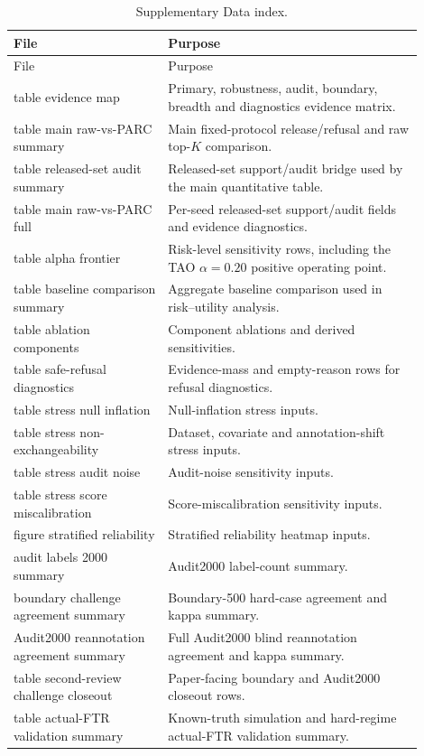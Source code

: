 \documentclass[11pt]{article}
\begin{document}
\begingroup
\small
\begin{longtable}{p{0.34\linewidth}p{0.56\linewidth}}
\caption{Supplementary Data index.}\\
\toprule
File & Purpose \\
\midrule
\endfirsthead
\toprule
File & Purpose \\
\midrule
\endhead
table evidence map & Primary, robustness, audit, boundary, breadth and diagnostics evidence matrix. \\
table main raw-vs-PARC summary & Main fixed-protocol release/refusal and raw top-\(K\) comparison. \\
table released-set audit summary & Released-set support/audit bridge used by the main quantitative table. \\
table main raw-vs-PARC full & Per-seed released-set support/audit fields and evidence diagnostics. \\
table alpha frontier & Risk-level sensitivity rows, including the TAO \(\alpha=0.20\) positive operating point. \\
table baseline comparison summary & Aggregate baseline comparison used in risk--utility analysis. \\
table ablation components & Component ablations and derived sensitivities. \\
table safe-refusal diagnostics & Evidence-mass and empty-reason rows for refusal diagnostics. \\
table stress null inflation & Null-inflation stress inputs. \\
table stress non-exchangeability & Dataset, covariate and annotation-shift stress inputs. \\
table stress audit noise & Audit-noise sensitivity inputs. \\
table stress score miscalibration & Score-miscalibration sensitivity inputs. \\
figure stratified reliability & Stratified reliability heatmap inputs. \\
audit labels 2000 summary & Audit2000 label-count summary. \\
boundary challenge agreement summary & Boundary-500 hard-case agreement and kappa summary. \\
Audit2000 reannotation agreement summary & Full Audit2000 blind reannotation agreement and kappa summary. \\
table second-review challenge closeout & Paper-facing boundary and Audit2000 closeout rows. \\
table actual-FTR validation summary & Known-truth simulation and hard-regime actual-FTR validation summary. \\

\end{longtable}
\end{document}
